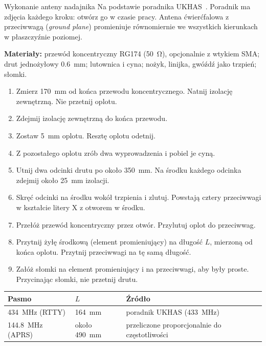 \begin{podsekcja}{Wykonanie anteny nadajnika}
Na podstawie poradnika UKHAS~\cite{ukhasantena}. Poradnik ma zdjęcia każdego kroku: otwórz go w czasie pracy. Antena ćwierćfalowa z przeciwwagą (\emph{ground plane}) promieniuje równomiernie we wszystkich kierunkach w płaszczyźnie poziomej.

\begin{center}\rysAntenaGP\end{center}
\label{fig:antena-gp}
\medskip

\textbf{Materiały:} przewód koncentryczny RG174 (\SI{50}{\ohm}), opcjonalnie z wtykiem SMA; drut jednożyłowy \SI{0.6}{mm}; lutownica i cyna; nożyk, linijka, gwóźdź jako trzpień; słomki.

\begin{enumerate}
  \item Zmierz \SI{170}{mm} od końca przewodu koncentrycznego. Natnij izolację zewnętrzną. Nie przetnij oplotu.
  \item Zdejmij izolację zewnętrzną do końca przewodu.
  \item Zostaw \SI{5}{mm} oplotu. Resztę oplotu odetnij.
  \item Z pozostałego oplotu zrób dwa wyprowadzenia i pobiel je cyną.
  \item Utnij dwa odcinki drutu po około \SI{350}{mm}. Na środku każdego odcinka zdejmij około \SI{25}{mm} izolacji.
  \item Skręć odcinki na środku wokół trzpienia i zlutuj. Powstają cztery przeciwwagi w kształcie litery X z otworem w środku.
  \item Przełóż przewód koncentryczny przez otwór. Przylutuj oplot do przeciwwag.
  \item Przytnij żyłę środkową (element promieniujący) na długość $L$, mierzoną od końca oplotu. Przytnij przeciwwagi na tę samą długość.
  \item Załóż słomki na element promieniujący i na przeciwwagi, aby były proste. Przycinając słomki, nie przetnij drutu.
\end{enumerate}

\begin{center}\small
\begin{tabular}{lll}
\toprule
Pasmo & $L$ & Źródło\\
\midrule
\SI{434}{MHz} (RTTY) & \SI{164}{mm} & poradnik UKHAS (\SI{433}{MHz})\\
\SI{144.8}{MHz} (APRS) & około \SI{490}{mm} & przeliczone proporcjonalnie do częstotliwości\\
\bottomrule
\end{tabular}
\end{center}


\end{podsekcja}
